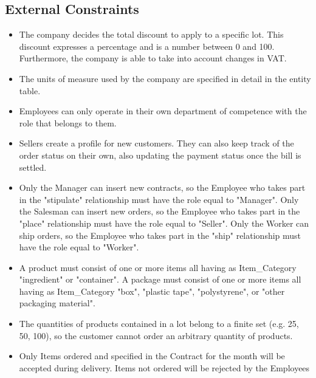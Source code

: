\subsection{External Constraints}
\begin{itemize}
\item The company decides the total discount to apply to a specific lot. This discount expresses a percentage and is a number between 0 and 100. Furthermore, the company is able to take into account changes in VAT.
\item The units of measure used by the company are specified in detail in the entity table.
\item Employees can only operate in their own department of competence with the role that belongs to them.
\item Sellers create a profile for new customers. They can also keep track of the order status on their own, also updating the payment status once the bill is settled.
\item Only the Manager can insert new contracts, so the Employee who takes part in the "stipulate" relationship must have the role equal to "Manager". Only the Salesman can insert new orders, so the Employee who takes part in the "place" relationship must have the role equal to "Seller". Only the Worker can ship orders, so the Employee who takes part in the "ship" relationship must have the role equal to "Worker".
\item A product must consist of one or more items all having as Item\_Category "ingredient" or "container". A package must consist of one or more items all having as Item\_Category "box", "plastic tape", "polystyrene", or "other packaging material". %
\item The quantities of products contained in a lot belong to a finite set (e.g. 25, 50, 100), so the customer cannot order an arbitrary quantity of products.
\item Only Items ordered and specified in the Contract for the month will be accepted during delivery. Items not ordered will be rejected by the Employees
\end{itemize}